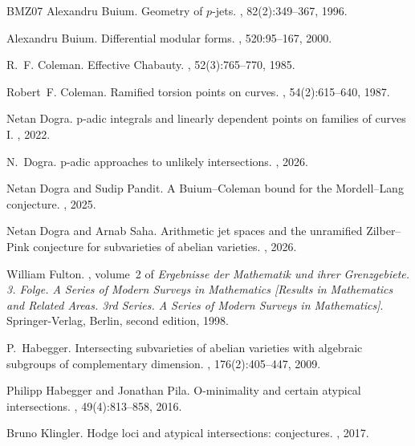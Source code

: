 \documentclass[11pt]{amsart}
\theoremstyle{plain}
\theoremstyle{definition}
\begin{document}
\begin{thebibliography}{BMZ07}
Alexandru Buium.
\newblock Geometry of {$p$}-jets.
, 82(2):349--367, 1996.

Alexandru Buium.
\newblock Differential modular forms.
, 520:95--167, 2000.

R.~F. Coleman.
\newblock Effective {C}habauty.
, 52(3):765--770, 1985.

Robert~F. Coleman.
\newblock Ramified torsion points on curves.
, 54(2):615--640, 1987.

Netan Dogra.
\newblock p-adic integrals and linearly dependent points on families of curves {I}.
, 2022.

N.~Dogra.
\newblock p-adic approaches to unlikely intersections.
, 2026.

Netan Dogra and Sudip Pandit.
\newblock A {B}uium--{C}oleman bound for the {M}ordell--{L}ang conjecture.
, 2025.

Netan Dogra and Arnab Saha.
\newblock Arithmetic jet spaces and the unramified {Z}ilber--{P}ink conjecture for subvarieties of abelian varieties.
, 2026.

William Fulton.
, volume~2 of {\em Ergebnisse der Mathematik und ihrer Grenzgebiete. 3. Folge. A Series of Modern Surveys in Mathematics [Results in Mathematics and Related Areas. 3rd Series. A Series of Modern Surveys in Mathematics]}.
\newblock Springer-Verlag, Berlin, second edition, 1998.

P.~Habegger.
\newblock Intersecting subvarieties of abelian varieties with algebraic subgroups of complementary dimension.
, 176(2):405--447, 2009.

Philipp Habegger and Jonathan Pila.
\newblock O-minimality and certain atypical intersections.
, 49(4):813--858, 2016.

Bruno Klingler.
\newblock Hodge loci and atypical intersections: conjectures.
, 2017.


\end{thebibliography}
\end{document}
